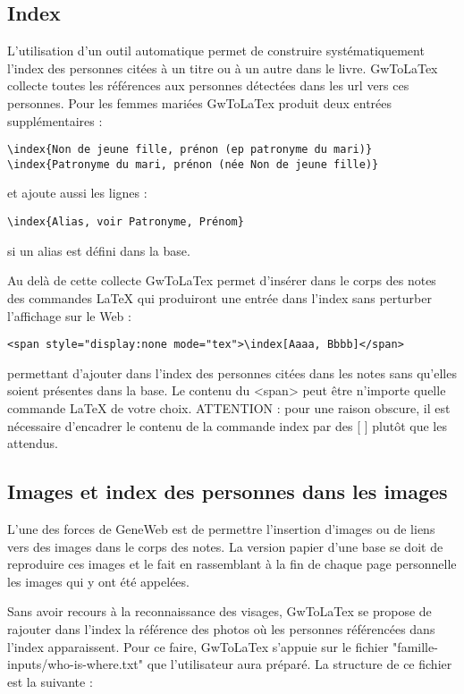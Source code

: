 \subsection{Index}

L'utilisation d'un outil automatique permet de construire systématiquement
l'index des personnes citées à un titre ou à un autre dans le livre.
GwToLaTex collecte toutes les références aux personnes
détectées dans les url vers ces personnes. Pour les femmes mariées
GwToLaTex produit deux entrées supplémentaires :
\begin{verbatim}
\index{Non de jeune fille, prénon (ep patronyme du mari)}
\index{Patronyme du mari, prénon (née Non de jeune fille)}
\end{verbatim}
et ajoute aussi les lignes :
\begin{verbatim}
\index{Alias, voir Patronyme, Prénom}
\end{verbatim}
si un alias est défini dans la base.

Au delà de cette collecte GwToLaTex permet d'insérer dans le corps des notes
des commandes LaTeX qui produiront une entrée dans l'index sans perturber
l'affichage sur le Web :
\begin{verbatim}
<span style="display:none mode="tex">\index[Aaaa, Bbbb]</span>
\end{verbatim}
permettant d'ajouter dans l'index des personnes citées dans les notes
sans qu'elles soient présentes dans la base.
Le contenu du <span> peut être n'importe quelle commande LaTeX de votre choix.
ATTENTION : pour une raison obscure, il est nécessaire d'encadrer le
contenu de la commande index par des [ ] plutôt que les { } attendus.

\subsection{Images et index des personnes dans les images}

L'une des forces de GeneWeb est de permettre l'insertion d'images ou de 
liens vers des images dans le corps des notes. La version papier d'une base
se doit de reproduire ces images et le fait en rassemblant à la fin de chaque
page personnelle les images qui y ont été appelées.

Sans avoir recours à la reconnaissance des visages, GwToLaTex se propose de
rajouter dans l'index la référence des photos où les personnes référencées
dans l'index apparaissent. Pour ce faire, GwToLaTex s'appuie sur le fichier
"famille-inputs/who-is-where.txt" que l'utilisateur aura préparé.
La structure de ce fichier est la suivante :

